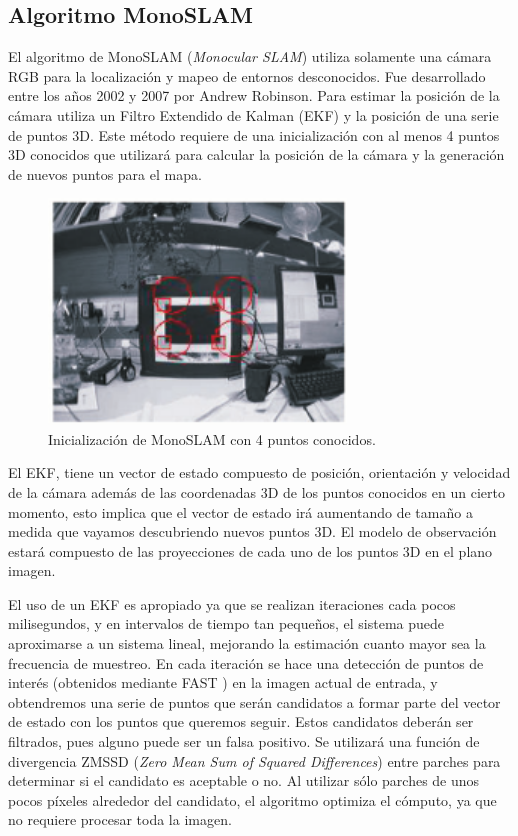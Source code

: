 \subsection{Algoritmo MonoSLAM}
El algoritmo de  MonoSLAM (\textit{Monocular SLAM}) \cite{Davison2007monoslam} utiliza solamente una cámara RGB para la localización y mapeo de entornos desconocidos. Fue desarrollado entre los años 2002 y 2007  por Andrew Robinson. Para estimar la posición de la cámara utiliza un Filtro Extendido de Kalman (EKF) y la posición de una serie de puntos 3D. Este método requiere de una inicialización con al menos 4 puntos 3D conocidos que utilizará para calcular la posición de la cámara y la generación de nuevos puntos para el mapa.
\begin{figure}[H]
\begin{center}
\includegraphics[height=6.0cm]{img/cap4/Initialization4PointsMonoSlam.png}
\end{center}
\caption{Inicialización de MonoSLAM con 4 puntos conocidos.}
\end{figure}

El EKF, tiene un vector de estado compuesto de posición, orientación y velocidad de la cámara además de las coordenadas 3D de los puntos conocidos en un cierto momento, esto implica que el vector de estado irá aumentando de tamaño a medida que vayamos descubriendo nuevos puntos 3D. El modelo de observación estará compuesto de las proyecciones de cada uno de los puntos 3D en el plano imagen.

El uso de un EKF es apropiado ya que se realizan iteraciones cada pocos milisegundos, y en intervalos de tiempo tan pequeños, el sistema puede aproximarse a un sistema lineal, mejorando la estimación cuanto mayor sea la frecuencia de muestreo. En cada iteración se hace una detección de puntos de interés (obtenidos mediante FAST \cite{FastCorner98}) en la imagen actual de entrada, y obtendremos una serie de puntos que serán candidatos a formar parte del vector de estado con los puntos que queremos seguir. Estos candidatos deberán ser filtrados, pues alguno puede ser un falsa positivo. Se utilizará una función de divergencia ZMSSD (\textit{Zero Mean Sum of Squared Differences}) entre parches para determinar si el candidato es aceptable o no. Al utilizar sólo parches de unos pocos píxeles alrededor del candidato, el algoritmo optimiza el cómputo, ya que no requiere procesar toda la imagen.

